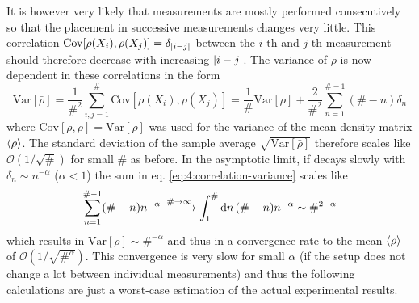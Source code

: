 It is however very likely that measurements are mostly performed consecutively so that the placement in successive measurements changes very little.
This correlation $\mathrm{Cov}[\rho(X_i), \rho(X_j)] = \delta_{\left\lvert i-j\right\rvert}$ between the $i$-th and $j$-th measurement should therefore decrease with increasing $\left\lvert i-j\right\rvert$.
The variance of $\bar{\rho}$ is now dependent in these correlations in the form \cite[p. 1227]{Riley_2018}
\begin{equation}\label{eq:4:correlation-variance}
  \mathrm{Var}[\bar{\rho}] = \frac{1}{\#^2} \sum_{i,j=1}^{\#} \mathrm{Cov}[\rho(X_i), \rho(X_j)] = \frac{1}{\#}\mathrm{Var}[\rho] + \frac{2}{\#^2}\sum_{n=1}^{\# - 1}(\# - n) \delta_n
\end{equation}
where $\mathrm{Cov}[\rho, \rho] = \mathrm{Var}[\rho]$ was used for the variance of the mean density matrix $\left\langle\rho\right\rangle$.
The standard deviation of the sample average $\sqrt{\mathrm{Var}[\bar{\rho}]}$ therefore scales like $\mathcal{O}(1/\sqrt{\#})$ for small $\#$ as before.
In the asymptotic limit, if decays slowly with $\delta_n \sim n^{-\alpha}$ ($\alpha < 1$) the sum in eq. \eqref{eq:4:correlation-variance} scales like
\begin{equation}
  \sum_{n=1}^{\# - 1}(\# - n)n^{-\alpha} \xlongrightarrow{\#\rightarrow\infty} \int_1^{\#}\dd n \, (\#-n)n^{-\alpha} \sim \#^{2-\alpha}
\end{equation}
which results in $\mathrm{Var}[\bar{\rho}] \sim \#^{-\alpha}$ and thus in a convergence rate to the mean $\left\langle\rho\right\rangle$ of $\mathcal{O}(1/\sqrt{\#^\alpha})$.
This convergence is very slow for small $\alpha$ (if the setup does not change a lot between individual measurements) and thus the following calculations are just a worst-case estimation of the actual experimental results.









